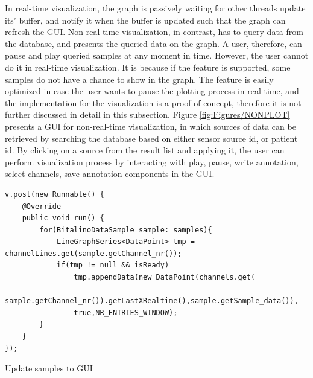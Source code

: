 In real-time visualization, the graph is passively waiting for other threads update its’ buffer, and notify it when the buffer is updated such that the graph can refresh the GUI. Non-real-time visualization, in contrast, has to query data from the database, and presents the queried data on the graph. A user, therefore, can pause and play queried samples at any moment in time. However, the user cannot do it in real-time visualization. It is because if the feature is supported, some samples do not have a chance to show in the graph. The feature is easily optimized in case the user wants to pause the plotting process in real-time, and the implementation for the visualization is a proof-of-concept, therefore it is not further discussed in detail in this subsection. Figure \ref{fig:Figures/NONPLOT} presents a GUI for non-real-time visualization, in which sources of data can be retrieved by searching the database based on either sensor source id, or patient id. By clicking on a source from the result list and applying it, the user can perform visualization process by interacting with play, pause, write annotation, select channels, save annotation components in the GUI.
\begin{code}[ht]
\begin{lstlisting}
v.post(new Runnable() {
    @Override
    public void run() {
        for(BitalinoDataSample sample: samples){
            LineGraphSeries<DataPoint> tmp = channelLines.get(sample.getChannel_nr());
            if(tmp != null && isReady)
                tmp.appendData(new DataPoint(channels.get(
                sample.getChannel_nr()).getLastXRealtime(),sample.getSample_data()),
                true,NR_ENTRIES_WINDOW);
        }
    }
});
\end{lstlisting}
\caption[Update samples to GUI]{Update samples to GUI}
\label{listing:PLOTGUI}
\end{code}